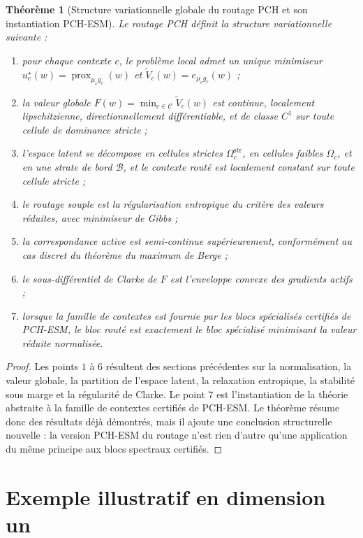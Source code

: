 \documentclass[11pt,a4paper]{article}
\newtheorem{theorem}{Théorème}[section]
\DeclareMathOperator{\prox}{prox}
\newcommand{\Ccal}{\mathcal C}
\newcommand{\Bcal}{\mathcal B}
\begin{document}
\begin{theorem}[Structure variationnelle globale du routage PCH et son instantiation PCH-ESM]
Le routage PCH définit la structure variationnelle suivante :
\begin{enumerate}[leftmargin=2em]
\item pour chaque contexte \(c\), le problème local admet un unique minimiseur \(u_c^\star(w)=\prox_{\mu_c g_c}(w)\) et \(\widetilde V_c(w)=e_{\mu_c g_c}(w)\) ;
\item la valeur globale \(F(w)=\min_{c\in\Ccal}\widetilde V_c(w)\) est continue, localement lipschitzienne, directionnellement différentiable, et de classe \(C^1\) sur toute cellule de dominance stricte ;
\item l'espace latent se décompose en cellules strictes \(\Omega_c^{\mathrm{str}}\), en cellules faibles \(\Omega_c\), et en une strate de bord \(\Bcal\), et le contexte routé est localement constant sur toute cellule stricte ;
\item le routage souple est la régularisation entropique du critère des valeurs réduites, avec minimiseur de Gibbs ;
\item la correspondance active est semi-continue supérieurement, conformément au cas discret du théorème du maximum de Berge ;
\item le sous-différentiel de Clarke de \(F\) est l'enveloppe convexe des gradients actifs ;
\item lorsque la famille de contextes est fournie par les blocs spécialisés certifiés de PCH-ESM, le bloc routé est exactement le bloc spécialisé minimisant la valeur réduite normalisée.
\end{enumerate}
\end{theorem}

\begin{proof}
Les points \(1\) à \(6\) résultent des sections précédentes sur la normalisation, la valeur globale, la partition de l'espace latent, la relaxation entropique, la stabilité sous marge et la régularité de Clarke. Le point \(7\) est l'instantiation de la théorie abstraite à la famille de contextes certifiés de PCH-ESM. Le théorème résume donc des résultats déjà démontrés, mais il ajoute une conclusion structurelle nouvelle : la version PCH-ESM du routage n'est rien d'autre qu'une application du même principe aux blocs spectraux certifiés.
\end{proof}

\section{Exemple illustratif en dimension un}
\end{document}
